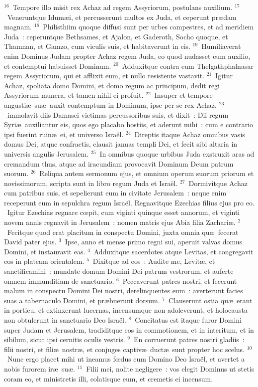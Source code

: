 ${}^{16}$~Tempore illo misit rex Achaz ad regem Assyriorum, postulans auxilium.
${}^{17}$~Veneruntque Idum\ae i, et percusserunt multos ex Juda, et ceperunt pr\ae dam magnam.
${}^{18}$~Philisthiim quoque diffusi sunt per urbes campestres, et ad meridiem Juda~: ceperuntque Bethsames, et Ajalon, et Gaderoth, Socho quoque, et Thamnan, et Gamzo, cum viculis suis, et habitaverunt in eis.
${}^{19}$~Humiliaverat enim Dominus Judam propter Achaz regem Juda, eo quod nudasset eum auxilio, et contemptui habuisset Dominum.
${}^{20}$~Adduxitque contra eum Thelgathphalnasar regem Assyriorum, qui et afflixit eum, et nullo resistente vastavit.
${}^{21}$~Igitur Achaz, spoliata domo Domini, et domo regum ac principum, dedit regi Assyriorum munera, et tamen nihil ei profuit.
${}^{22}$~Insuper et tempore angusti\ae\ su\ae\ auxit contemptum in Dominum, ipse per se rex Achaz,
${}^{23}$~immolavit diis Damasci victimas percussoribus suis, et dixit~: Dii regum Syri\ae\ auxiliantur eis, quos ego placabo hostiis, et aderunt mihi~: cum e contrario ipsi fuerint ruin\ae\ ei, et universo Isra\"el.
${}^{24}$~Direptis itaque Achaz omnibus vasis domus Dei, atque confractis, clausit januas templi Dei, et fecit sibi altaria in universis angulis Jerusalem.
${}^{25}$~In omnibus quoque urbibus Juda exstruxit aras ad cremandum thus, atque ad iracundiam provocavit Dominum Deum patrum suorum.
${}^{26}$~Reliqua autem sermonum ejus, et omnium operum suorum priorum et novissimorum, scripta sunt in libro regum Juda et Isra\"el.
${}^{27}$~Dormivitque Achaz cum patribus suis, et sepelierunt eum in civitate Jerusalem~: neque enim receperunt eum in sepulchra regum Isra\"el. Regnavitque Ezechias filius ejus pro eo.
~Igitur Ezechias regnare cœpit, cum viginti quinque esset annorum, et viginti novem annis regnavit in Jerusalem~: nomen matris ejus Abia filia Zachari\ae .
${}^{2}$~Fecitque quod erat placitum in conspectu Domini, juxta omnia qu\ae\ fecerat David pater ejus.
${}^{3}$~Ipse, anno et mense primo regni sui, aperuit valvas domus Domini, et instauravit eas.
${}^{4}$~Adduxitque sacerdotes atque Levitas, et congregavit eos in plateam orientalem.
${}^{5}$~Dixitque ad eos~: Audite me, Levit\ae , et sanctificamini~: mundate domum Domini Dei patrum vestrorum, et auferte omnem immunditiam de sanctuario.
${}^{6}$~Peccaverunt patres nostri, et fecerunt malum in conspectu Domini Dei nostri, derelinquentes eum~: averterunt facies suas a tabernaculo Domini, et pr\ae buerunt dorsum.
${}^{7}$~Clauserunt ostia qu\ae\ erant in porticu, et extinxerunt lucernas, incensumque non adoleverunt, et holocausta non obtulerunt in sanctuario Deo Isra\"el.
${}^{8}$~Concitatus est itaque furor Domini super Judam et Jerusalem, tradiditque eos in commotionem, et in interitum, et in sibilum, sicut ipsi cernitis oculis vestris.
${}^{9}$~En corruerunt patres nostri gladiis~: filii nostri, et fili\ae\ nostr\ae , et conjuges captiv\ae\ duct\ae\ sunt propter hoc scelus.
${}^{10}$~Nunc ergo placet mihi ut ineamus fœdus cum Domino Deo Isra\"el, et avertet a nobis furorem ir\ae\ su\ae .
${}^{11}$~Filii mei, nolite negligere~: vos elegit Dominus ut stetis coram eo, et ministretis illi, colatisque eum, et cremetis ei incensum.


